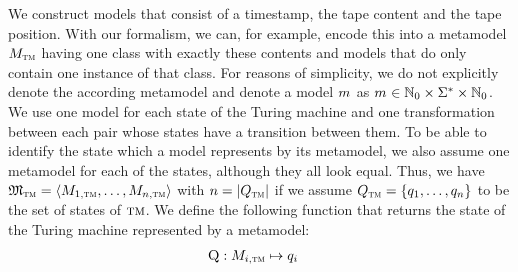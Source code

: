 We construct models that consist of a timestamp, the tape content and the tape position.
With our formalism, we can, for example, encode this into a metamodel $M_{\textsc{tm}}$ having one class with exactly these contents and models that do only contain one instance of that class.
For reasons of simplicity, we do not explicitly denote the according metamodel and denote a model $m_{}$ as $m_{} \in \mathbb{N}_0 \times \Sigma^* \times \mathbb{N}_0$.
We use one model for each state of the Turing machine and one transformation between each pair whose states have a transition between them.
To be able to identify the state which a model represents by its metamodel, we also assume one metamodel for each of the states, although they all look equal. Thus, we have $\mathfrak{M}_{\textsc{tm}} = \langle M_{1, \textsc{tm}}, \dots, M_{n, \textsc{tm}} \rangle$ with $n = \lvert Q_{\textsc{tm}}\rvert$ if we assume $Q_{\textsc{tm}} = \{ q_1, \dots, q_n \}$ to be the set of states of $\textsc{tm}$.
We define the following function that returns the state of the Turing machine represented by a metamodel:
\begin{align*}
     \function{Q} : %
     \metamodel{M}{i,\TuringMachine} & \mapsto q_i %
\end{align*}

